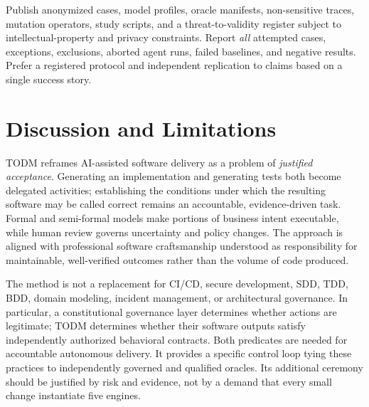 \documentclass[11pt,a4paper]{article}
\begin{document}
Publish anonymized cases, model profiles, oracle manifests, non-sensitive traces, mutation operators, study scripts, and a threat-to-validity register subject to intellectual-property and privacy constraints. Report \emph{all} attempted cases, exceptions, exclusions, aborted agent runs, failed baselines, and negative results. Prefer a registered protocol and independent replication to claims based on a single success story.

\section{Discussion and Limitations}
TODM reframes AI-assisted software delivery as a problem of \emph{justified acceptance}. Generating an implementation and generating tests both become delegated activities; establishing the conditions under which the resulting software may be called correct remains an accountable, evidence-driven task. Formal and semi-formal models make portions of business intent executable, while human review governs uncertainty and policy changes. The approach is aligned with professional software craftsmanship understood as responsibility for maintainable, well-verified outcomes rather than the volume of code produced.

The method is not a replacement for CI/CD, secure development, SDD, TDD, BDD, domain modeling, incident management, or architectural governance. In particular, a constitutional governance layer determines whether actions are legitimate; TODM determines whether their software outputs satisfy independently authorized behavioral contracts. Both predicates are needed for accountable autonomous delivery. It provides a specific control loop tying these practices to independently governed and qualified oracles. Its additional ceremony should be justified by risk and evidence, not by a demand that every small change instantiate five engines.
\end{document}
